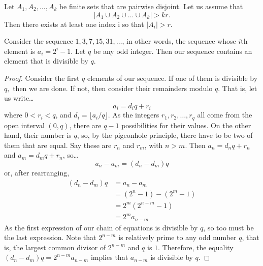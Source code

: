 \begin{theorem}
Let $A_1, A_2, \dots, A_k$ be finite sets that are pairwise disjoint. Let us assume that
$$|A_1 \cup A_2 \cup \dots \cup A_k| > kr.$$
Then there exists at least one index i so that $|A_i| > r$.
\end{theorem}

\begin{example}
Consider the sequence $1,3,7,15,31,\dots$, in other words, the sequence whose $i$th element is $a_i = 2^i-1.$ Let $q$ be any odd integer.
Then our sequence contains an element that is divisible by $q$.
\end{example}

\begin{proof}
Consider the first $q$ elements of our sequence. If one of them is divisible by $q,$ then we are done. If not, then consider their remainders modulo $q$. That is, let us write\dots
$$a_i = d_i q + r_i$$
where $0 < r_i < q$, and $d_i = \lfloor a_i / q \rfloor $. As the integers $r_1,r_2,\dots,r_q$ all come from the open interval $(0,q)$, there are $q-1$ possibilities for their values. 
On the other hand, their number is $q$, so, by the pigeonhole principle, there have to be two of them that are equal. Say these are $r_n$ and $r_m$, with $n > m$. Then $a_n = d_n q + r_n$
and $a_m = d_m q + r_n$, so\dots
$$a_n - a_m = (d_n - d_m)q$$
or, after rearranging,
\begin{align*}
  (d_n - d_m)q &= a_n - a_m \\
  			   &= (2^n - 1) - (2^m - 1) \\
 			   &= 2^m(2^{n-m} - 1)\\
 			   &= 2^m a_{n-m}
\end{align*}
As the first expression of our chain of equations is divisible by $q$, so too must be the last expression. Note that $2^{n-m}$ is relatively prime to any odd number $q$, that is, the largest
common divisor of $2^{n-m}$ and $q$ is $1$. Therefore, the equality $(d_n - d_m)q = 2^{n-m}a_{n-m}$ implies that $a_{n-m}$ is divisible by $q.$
\end{proof}